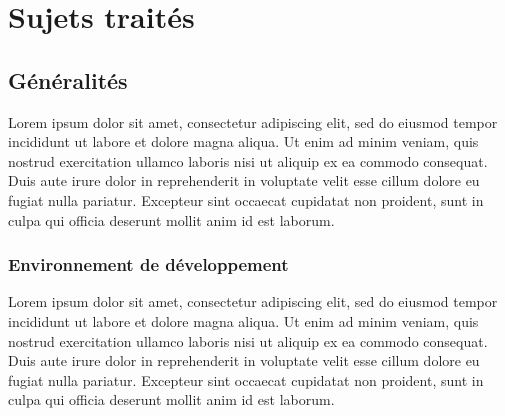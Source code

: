 \documentclass[a4paper, 12pt]{report}
\begin{document}
\chapter{Sujets traités}

\section{Généralités}

Lorem ipsum dolor sit amet, consectetur adipiscing elit, sed do eiusmod tempor incididunt ut labore et dolore magna aliqua. Ut enim ad minim veniam, quis nostrud exercitation ullamco laboris nisi ut aliquip ex ea commodo consequat. Duis aute irure dolor in reprehenderit in voluptate velit esse cillum dolore eu fugiat nulla pariatur. Excepteur sint occaecat cupidatat non proident, sunt in culpa qui officia deserunt mollit anim id est laborum.

\subsection{Environnement de développement}

Lorem ipsum dolor sit amet, consectetur adipiscing elit, sed do eiusmod tempor incididunt ut labore et dolore magna aliqua. Ut enim ad minim veniam, quis nostrud exercitation ullamco laboris nisi ut aliquip ex ea commodo consequat. Duis aute irure dolor in reprehenderit in voluptate velit esse cillum dolore eu fugiat nulla pariatur. Excepteur sint occaecat cupidatat non proident, sunt in culpa qui officia deserunt mollit anim id est laborum.
\end{document}
